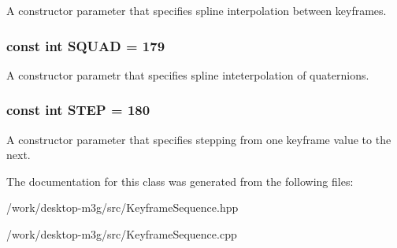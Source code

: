 A constructor parameter that specifies spline interpolation between keyframes. \hypertarget{classm3g_1_1KeyframeSequence_0ad85e76e101b5eabf5a5c5f48648845}{
\subsubsection[{SQUAD}]{\setlength{\rightskip}{0pt plus 5cm}const int {\bf SQUAD} = 179}}
\label{classm3g_1_1KeyframeSequence_0ad85e76e101b5eabf5a5c5f48648845}


A constructor parametr that specifies spline inteterpolation of quaternions. \hypertarget{classm3g_1_1KeyframeSequence_07dc1c0bf7f480095150d1b1c34c8218}{
\subsubsection[{STEP}]{\setlength{\rightskip}{0pt plus 5cm}const int {\bf STEP} = 180}}
\label{classm3g_1_1KeyframeSequence_07dc1c0bf7f480095150d1b1c34c8218}


A constructor parameter that specifies stepping from one keyframe value to the next. 

The documentation for this class was generated from the following files:\begin{CompactItemize}
\item 
/work/desktop-m3g/src/KeyframeSequence.hpp\item 
/work/desktop-m3g/src/KeyframeSequence.cpp\end{CompactItemize}
